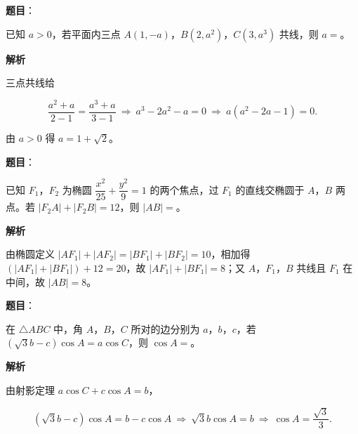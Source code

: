 \begin{answer}

\textbf{题目}：

已知 $a>0$，若平面内三点 $A(1,-a)$，$B(2,a^2)$，$C(3,a^3)$ 共线，则 $a=$\gkblank{}。

\textbf{解析}

三点共线给

\nopagebreak[4]
\[\frac{a^2+a}{2-1}=\frac{a^3+a}{3-1}\ \Longrightarrow\ a^3-2a^2-a=0\ \Longrightarrow\ a\left(a^2-2a-1\right)=0.\]

由 $a>0$ 得 $a=1+\sqrt2$。


\end{answer}
\begin{answer}

\textbf{题目}：

已知 $F_1$，$F_2$ 为椭圆 $\dfrac{x^2}{25}+\dfrac{y^2}9=1$ 的两个焦点，过 $F_1$ 的直线交椭圆于 $A$，$B$ 两点。若 $|F_2A|+|F_2B|=12$，则 $|AB|=$\gkblank{}。

\textbf{解析}

由椭圆定义 $|AF_1|+|AF_2|=|BF_1|+|BF_2|=10$，相加得 $\left(|AF_1|+|BF_1|\right)+12=20$，故 $|AF_1|+|BF_1|=8$；又 $A$，$F_1$，$B$ 共线且 $F_1$ 在中间，故 $|AB|=8$。


\end{answer}
\begin{answer}

\textbf{题目}：

在 $\triangle ABC$ 中，角 $A$，$B$，$C$ 所对的边分别为 $a$，$b$，$c$，若 $(\sqrt3b-c)\cos A=a\cos C$，则 $\cos A=$\gkblank{}。

\textbf{解析}

由射影定理 $a\cos C+c\cos A=b$，

\nopagebreak[4]
\[(\sqrt3b-c)\cos A=b-c\cos A\ \Longrightarrow\ \sqrt3b\cos A=b\ \Longrightarrow\ \cos A=\frac{\sqrt3}3.\]


\end{answer}
